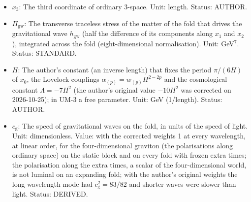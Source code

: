 \documentclass[
  10pt,
]{article}
\begin{document}
\begin{itemize}
  \(\mathrm{e}^{X}\) is the exponential of \(X\). Unit: dimensionless.
  Value: 2.718281828. Status: STANDARD.
\item
  \(x_3\): The third coordinate of ordinary 3-space. Unit: length.
  Status: AUTHOR.
\item
  \(\Pi_{\mathrm{gw}}\): The transverse traceless stress of the matter
  of the fold that drives the gravitational wave \(h_{\mathrm{gw}}\)
  (half the difference of its components along \(x_1\) and \(x_2\)),
  integrated across the fold (eight-dimensional normalisation). Unit:
  GeV\(^7\). Status: STANDARD.
\item
  \(H\): The author's constant (an inverse length) that fixes the period
  \(\pi/(6H)\) of \(x_0\), the Lovelock couplings
  \(\alpha_{(p)} = w_{(p)}H^{2-2p}\) and the cosmological constant
  \(\Lambda = -7H^2\) (the author's original value \(-10H^2\) was
  corrected on 2026-10-25); in UM-3 a free parameter. Unit: GeV
  (1/length). Status: AUTHOR.
\item
  \(c_{\mathrm{g}}\): The speed of gravitational waves on the fold, in
  units of the speed of light. Unit: dimensionless. Value: with the
  corrected weights 1 at every wavelength, at linear order, for the
  four-dimensional graviton (the polarisations along ordinary space) on
  the static block and on every fold with frozen extra times; the
  polarisation along the extra times, a scalar of the four-dimensional
  world, is not luminal on an expanding fold; with the author's original
  weights the long-wavelength mode had \(c_{\mathrm{g}}^2 = 83/82\) and
  shorter waves were slower than light. Status: DERIVED.
\end{itemize}
\end{document}
